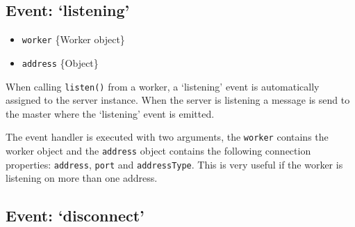 \begin{Shaded}
\begin{Highlighting}[]
\NormalTok{(}\NormalTok{, }
  \NormalTok{(}\NormalTok{);}
\NormalTok{\});}
\end{Highlighting}
\end{Shaded}

\subsection{Event: `listening'}

\begin{itemize}
\item
  \texttt{worker} \{Worker object\}
\item
  \texttt{address} \{Object\}
\end{itemize}

When calling \texttt{listen()} from a worker, a `listening' event is
automatically assigned to the server instance. When the server is
listening a message is send to the master where the `listening' event is
emitted.

The event handler is executed with two arguments, the \texttt{worker}
contains the worker object and the \texttt{address} object contains the
following connection properties: \texttt{address}, \texttt{port} and
\texttt{addressType}. This is very useful if the worker is listening on
more than one address.

\begin{Shaded}
\begin{Highlighting}[]
\NormalTok{(}\NormalTok{, }
  \NormalTok{(} \NormalTok{+ } \NormalTok{+ } \NormalTok{+ }\NormalTok{);}
\NormalTok{\});}
\end{Highlighting}
\end{Shaded}

\subsection{Event: `disconnect'}

